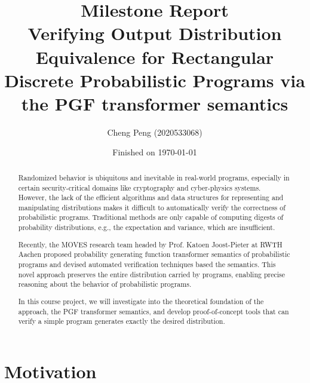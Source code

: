 \documentclass[a4paper]{article}
\title{Milestone Report\\
	\small Verifying Output Distribution Equivalence for Rectangular Discrete Probabilistic Programs via the PGF transformer semantics
}
\date{Finished on \today}
\author{Cheng Peng (2020533068)}
\begin{document}
\maketitle


\begin{abstract}
	Randomized behavior is ubiquitous and inevitable in real-world programs, especially in certain security-critical domains like cryptography and cyber-physics systems.
	However, the lack of the efficient algorithms and data structures for representing and manipulating distributions makes it difficult to automatically verify the correctness of probabilistic programs.
	Traditional methods are only capable of computing digests of probability distributions, e.g., the expectation and variance, which are insufficient.\par
	Recently, the MOVES research team headed by Prof. Katoen Joost-Pieter at RWTH Aachen proposed probability generating function transformer semantics of probabilistic programs and devised automated verification techniques based the semantics.
	This novel approach preserves the entire distribution carried by programs, enabling precise reasoning about the behavior of probabilistic programs.\par
	In this course project, we will investigate into the theoretical foundation of the approach, the PGF transformer semantics, and develop proof-of-concept tools that can verify a simple program generates exactly the desired distribution.
\end{abstract}

\pagebreak

\section{Motivation}
\end{document}
